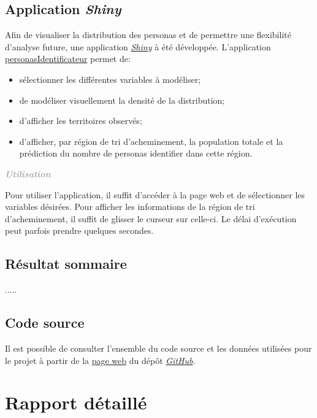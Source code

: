 \documentclass[11pt,french]{report}\usepackage[]{graphicx}\usepackage[]{color}
\newenvironment{moreInfo}[1]
	{\begin{mdframed}
	\textcolor{darkgray}{\huge \raisebox{-3.5pt}{\faInfo} 
	\hspace{0.5cm} \large\bfseries #1}\\[5pt]
	\normalsize
	\makebox[0.1\textwidth][l]{}	
	\begin{minipage}{10cm}}
	{	\end{minipage}
	\end{mdframed}}
\begin{document}
\section*{Application \emph{Shiny}}

Afin de visualiser la distribution des personas et de permettre une flexibilité d'analyse future, une application \href{https://www.rstudio.com/products/shiny/}{\emph{Shiny}} à été développée. L'application \href{https://davebulaval.shinyapps.io/personnasIdentificateur/}{personasIdentificateur} permet de:
\begin{itemize}
\item sélectionner les différentes variables à modéliser;
\item de modéliser visuellement la densité de la distribution;
\item d'afficher les territoires observés;
\item d'afficher, par région de tri d'acheminement, la population totale et la prédiction du nombre de personas identifier dans cette région.
\end{itemize}

\begin{moreInfo}{\color{Gray}\emph{Utilisation}
     \color{black}}
Pour utiliser l'application, il suffit d'accéder à la page web et de sélectionner les variables désirées. Pour afficher les informations de la région de tri d'acheminement, il suffit de glisser le curseur sur celle-ci.
     \newline
     Le délai d'exécution peut parfois prendre quelques secondes. 
\end{moreInfo}

\section*{Résultat sommaire}
.....

\section*{Code source}
Il est possible de consulter l'ensemble du code source et les données utilisées pour le projet à partir de la \href{https://davebulaval.github.io/Actulab_COOP/}{page web} du dépôt \href{https://github.com/davebulaval/Actulab_COOP}{\emph{GitHub}}.


\chapter*{Rapport détaillé}
\end{document}
